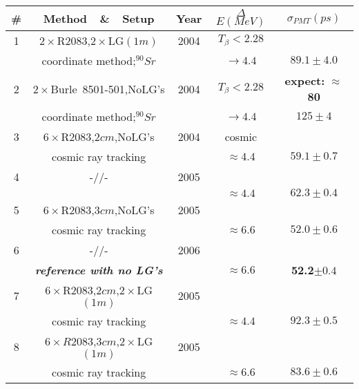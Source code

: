 
\begin{table}[ht]
\begin{center}
\begin{tabular}{|c|c|c|c|c|} \hline
\# &Method~~\&~~Setup            & Year & $\Delta$$E(MeV)$& $\sigma_{PMT}(ps)$         \\ \hline

1&$2\times$R2083,$2\times$LG$(1m)$      & 2004 &$T_{\beta}<2.28$ &  \\
 &coordinate method;$^{90}Sr$&      &$\rightarrow4.4$     & $89.1\pm4.0$             \\ \hline

2&$2\times$Burle~8501-501,NoLG's      & 2004 &$T_{\beta}<2.28$ &  \textbf{expect:} $\approx$ \textbf{80}\\ 
 &coordinate method;$^{90}Sr$&      &$\rightarrow4.4$     & $125\pm4$             \\ \hline

3&$6\times$R2083,$2cm$,NoLG's & 2004 &   cosmic        &                       \\
 &cosmic ray tracking  &      &    $\approx4.4$  &   $59.1\pm0.7$        \\ \hline

4&-//-        & 2005 &           &                       \\
 &           &      &    $\approx4.4$  &   $62.3\pm0.4$        \\ \hline

5&$6\times$R2083,$3cm$,NoLG's & 2005 &           &                       \\
 &cosmic ray tracking &      &    $\approx6.6$  &   ${52.0\pm0.6}$        \\ \hline

6&-//-          & 2006 &           &                       \\
 &\textbf{\textit{reference with no LG's}}&      & $\approx6.6$  & \textbf{52.2}$\pm0.4$ \\ \hline

7&$6\times$R2083,$2cm$,$2\times$LG$(1m)$     & 2005 &           &                       \\
 &cosmic ray tracking &      &    $\approx 4.4$  &   $92.3\pm0.5$        \\ \hline

8&$6\times R2083$,$3cm$,$2\times$LG$(1m)$ & 2005 &          &                       \\
 &  cosmic ray tracking  &      &    $\approx 6.6$  &   $83.6\pm0.6$        \\ \hline


\end{tabular}
\end{center}
\end{table}
